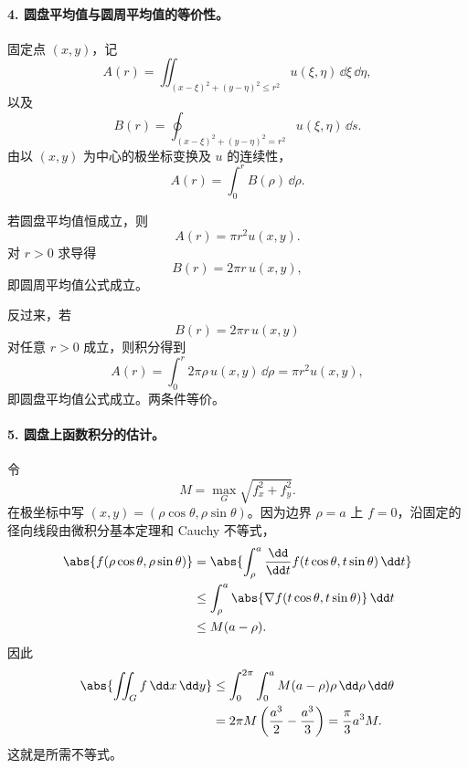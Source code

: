 \paragraph{4. 圆盘平均值与圆周平均值的等价性。}
\begin{xsolution}
固定点 $(x,y)$，记
\[
  A(r)=\iint_{(x-\xi)^2+(y-\eta)^2\le r^2}
  u(\xi,\eta)\,\dd\xi\,\dd\eta,
\]
以及
\[
  B(r)=\oint_{(x-\xi)^2+(y-\eta)^2=r^2}
  u(\xi,\eta)\,\dd s.
\]
由以 $(x,y)$ 为中心的极坐标变换及 $u$ 的连续性，
\[
  A(r)=\int_0^r B(\rho)\,\dd\rho.
\]

若圆盘平均值恒成立，则
\[
  A(r)=\pi r^2u(x,y).
\]
对 $r>0$ 求导得
\[
  B(r)=2\pi r\,u(x,y),
\]
即圆周平均值公式成立。

反过来，若
\[
  B(r)=2\pi r\,u(x,y)
\]
对任意 $r>0$ 成立，则积分得到
\[
  A(r)=\int_0^r2\pi\rho\,u(x,y)\,\dd\rho
  =\pi r^2u(x,y),
\]
即圆盘平均值公式成立。两条件等价。
\end{xsolution}

\paragraph{5. 圆盘上函数积分的估计。}
\begin{xsolution}
令
\[
  M=\max_G\sqrt{f_x^2+f_y^2}.
\]
在极坐标中写 $(x,y)=(\rho\cos\theta,\rho\sin\theta)$。因为边界 $\rho=a$ 上 $f=0$，沿固定的径向线段由微积分基本定理和 Cauchy 不等式，
\begin{align*}
  \abs{f(\rho\cos\theta,\rho\sin\theta)}
  &=\abs{\int_\rho^a
  \frac{\dd}{\dd t}f(t\cos\theta,t\sin\theta)\,\dd t}\\
  &\le\int_\rho^a\abs{\nabla f(t\cos\theta,t\sin\theta)}\,\dd t\\
  &\le M(a-\rho).
\end{align*}
因此
\begin{align*}
  \abs{\iint_Gf\,\dd x\,\dd y}
  &\le\int_0^{2\pi}\int_0^a M(a-\rho)\rho\,\dd\rho\,\dd\theta\\
  &=2\pi M\left(\frac{a^3}{2}-\frac{a^3}{3}\right)
   =\frac\pi3a^3M.
\end{align*}
这就是所需不等式。
\end{xsolution}

